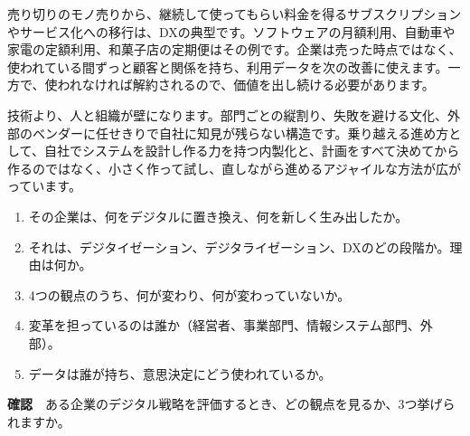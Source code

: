 \documentclass[paper=a4paper,fontsize=10pt,line_length=170mm,number_of_lines=46,baselineskip=1.6zw]{jlreq}
\newcommand\subhead[1]{\par\vspace{2.6mm}{\sffamily\bfseries\large #1}\par\vspace{1.3mm}}
\begin{document}
売り切りのモノ売りから、継続して使ってもらい料金を得るサブスクリプションやサービス化への移行は、DXの典型です。ソフトウェアの月額利用、自動車や家電の定額利用、和菓子店の定期便はその例です。企業は売った時点ではなく、使われている間ずっと顧客と関係を持ち、利用データを次の改善に使えます。一方で、使われなければ解約されるので、価値を出し続ける必要があります。\par\vspace{1.2mm}
\subhead{組織・人材・企業文化の壁}
技術より、人と組織が壁になります。部門ごとの縦割り、失敗を避ける文化、外部のベンダーに任せきりで自社に知見が残らない構造です。乗り越える進め方として、自社でシステムを設計し作る力を持つ内製化と、計画をすべて決めてから作るのではなく、小さく作って試し、直しながら進めるアジャイルな方法が広がっています。\par\vspace{1.2mm}
\subhead{企業のデジタル戦略を診るチェックリスト}
\begin{enumerate}[leftmargin=1.5em,itemsep=0.6mm,topsep=0.3mm]
\item その企業は、何をデジタルに置き換え、何を新しく生み出したか。
\item それは、デジタイゼーション、デジタライゼーション、DXのどの段階か。理由は何か。
\item 4つの観点のうち、何が変わり、何が変わっていないか。
\item 変革を担っているのは誰か（経営者、事業部門、情報システム部門、外部）。
\item データは誰が持ち、意思決定にどう使われているか。
\end{enumerate}\vspace{0.8mm}
\begin{checkbox}
{\sffamily\bfseries 確認}　ある企業のデジタル戦略を評価するとき、どの観点を見るか、3つ挙げられますか。\par
\end{checkbox}
\end{document}
